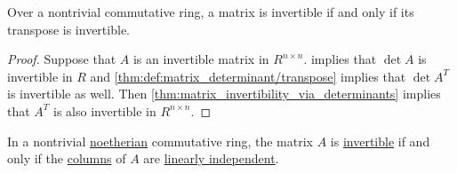 \begin{corollary}\label{thm:matrix_invertible_iff_transpose_invertible}
  Over a nontrivial commutative ring, a matrix is invertible if and only if its transpose is invertible.
\end{corollary}
\begin{proof}
  Suppose that \( A \) is an invertible matrix in \( R^{n \times n} \).  implies that \( \det A \) is invertible in \( R \) and \cref{thm:def:matrix_determinant/transpose} implies that \( \det A^T \) is invertible as well. Then \cref{thm:matrix_invertibility_via_determinants} implies that \( A^T \) is also invertible in \( R^{n \times n} \).
\end{proof}

\begin{proposition}\label{matrix_invertibility_via_columns}
  In a nontrivial \hyperref[def:noetherian_semiring]{noetherian} commutative ring, the matrix \( A \) is \hyperref[def:inverse_matrix]{invertible} if and only if the \hyperref[def:block_matrix]{columns} of \( A \) are \hyperref[def:linear_dependence]{linearly independent}.
\end{proposition}
